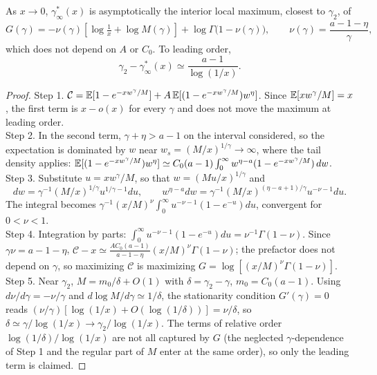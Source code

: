 \begin{proposition}\label{prop:smallx}
As $x\to0$, $\gamma^*_\infty(x)$ is asymptotically the interior local maximum, closest to
$\gamma_2$, of
\[
G(\gamma)=-\nu(\gamma)\left[\log\tfrac1x+\log M(\gamma)\right]+\log\Gamma\big(1-\nu(\gamma)\big),
\qquad \nu(\gamma)=\frac{a-1-\eta}{\gamma},
\]
which does not depend on $A$ or $C_0$. To leading order,
\[
\gamma_2-\gamma^*_\infty(x)\simeq\frac{a-1}{\log(1/x)}.
\]
\end{proposition}
\begin{proof}
Step 1. $\mathcal C=\mathbb{E}[1-e^{-xw^\gamma/M}]+A\,\mathbb{E}[(1-e^{-xw^\gamma/M})w^\eta]$. Since
$\mathbb{E}[xw^\gamma/M]=x$, the first term is $x-o(x)$ for every $\gamma$ and does not move the
maximum at leading order.\\
Step 2. In the second term, $\gamma+\eta>a-1$ on the interval considered, so the
expectation is dominated by $w$ near $w_s=(M/x)^{1/\gamma}\to\infty$, where the tail
density applies: $\mathbb{E}[(1-e^{-xw^\gamma/M})w^\eta]\simeq C_0(a-1)\int_0^\infty w^{\eta-a}(1-e^{-xw^\gamma/M})\,dw$.\\
Step 3. Substitute $u=xw^\gamma/M$, so that $w=(Mu/x)^{1/\gamma}$ and
\[
dw=\gamma^{-1}(M/x)^{1/\gamma}u^{1/\gamma-1}du,\qquad
w^{\eta-a}dw=\gamma^{-1}(M/x)^{(\eta-a+1)/\gamma}u^{-\nu-1}du .
\]
The integral becomes
$\gamma^{-1}(x/M)^{\nu}\int_0^\infty u^{-\nu-1}(1-e^{-u})du$, convergent for $0<\nu<1$.\\
Step 4. Integration by parts: $\int_0^\infty u^{-\nu-1}(1-e^{-u})du=\nu^{-1}\Gamma(1-\nu)$. Since
$\gamma\nu=a-1-\eta$, $\mathcal C-x\simeq\frac{AC_0(a-1)}{a-1-\eta}(x/M)^\nu\Gamma(1-\nu)$; the prefactor
does not depend on $\gamma$, so maximizing $\mathcal C$ is maximizing $G=\log[(x/M)^\nu\Gamma(1-\nu)]$.\\
Step 5. Near $\gamma_2$, $M=m_0/\delta+O(1)$ with $\delta=\gamma_2-\gamma$, $m_0=C_0(a-1)$. Using
$d\nu/d\gamma=-\nu/\gamma$ and $d\log M/d\gamma\simeq1/\delta$, the stationarity condition $G'(\gamma)=0$
reads $(\nu/\gamma)[\log(1/x)+O(\log(1/\delta))]=\nu/\delta$, so $\delta\simeq\gamma/\log(1/x)\to\gamma_2/\log(1/x)$.
The terms of relative order $\log(1/\delta)/\log(1/x)$ are not all captured by $G$ (the
neglected $\gamma$-dependence of Step 1 and the regular part of $M$ enter at the same
order), so only the leading term is claimed.
\end{proof}

